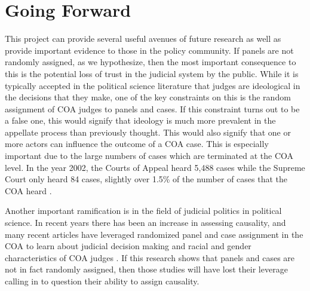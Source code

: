 \documentclass[12pt]{article}
\begin{document}
\section{Going Forward}\label{Further Research}
This project can provide several useful avenues of future research as well as provide important evidence to those in the policy community.  If panels are not randomly assigned, as we hypothesize, then the most important consequence to this is the potential loss of trust in the judicial system by the public.  While it is typically accepted in the political science literature that judges are ideological in the decisions that they make, one of the key constraints on this is the random assignment of COA judges to panels and cases.  If this constraint turns out to be a false one, this would signify that ideology is much more prevalent in the appellate process than previously thought.  This would also signify that one or more actors can influence the outcome of a COA case.  This is especially important due to the large numbers of cases which are terminated at the COA level.  In the year 2002, the Courts of Appeal heard 5,488 cases while the Supreme Court only heard 84 cases, slightly over 1.5\% of the number of cases that the COA heard \citep{judyearend,Songer2007}.   

Another important ramification is in the field of judicial politics in political science.  In recent years there has been an increase in assessing causality, and many recent articles have leveraged randomized panel and case assignment in the COA to learn about judicial decision making and racial and gender characteristics of COA judges \citep{Kastellec2010,Glynn2015,Farhang2014}.  If this research shows that panels and cases are not in fact randomly assigned, then those studies will have lost their leverage calling in to question their ability to assign causality.



\end{document}
